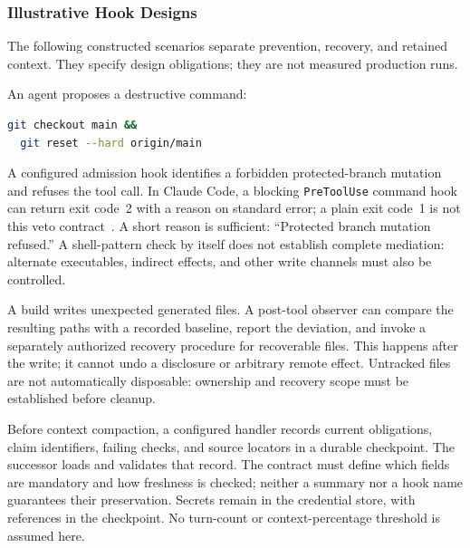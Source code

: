 \subsubsection{Illustrative Hook Designs}
\label{sec:lifecycle-hook-cases}
The following constructed scenarios separate prevention, recovery, and retained
context. They specify design obligations; they are not measured production runs.

\begin{description}[leftmargin=1.5em,style=sameline,font=\normalfont]
\item[\textbf{Case A: Pre-tool refusal.}]
An agent proposes a destructive command:
\begin{lstlisting}[language=bash,basicstyle=\ttfamily\small,breaklines=true]
git checkout main &&
  git reset --hard origin/main
\end{lstlisting}
A configured admission hook identifies a forbidden protected-branch mutation
and refuses the tool call. In Claude Code, a blocking \texttt{PreToolUse}
command hook can return exit code~2 with a reason on standard error; a plain
exit code~1 is not this veto contract~. A short
reason is sufficient: ``Protected branch mutation refused.'' A shell-pattern
check by itself does not establish complete mediation: alternate executables,
indirect effects, and other write channels must also be controlled.

\item[\textbf{Case B: Post-tool recovery.}]
A build writes unexpected generated files. A post-tool observer can compare
the resulting paths with a recorded baseline, report the deviation, and invoke
a separately authorized recovery procedure for recoverable files. This happens
after the write; it cannot undo a disclosure or arbitrary remote effect.
Untracked files are not automatically disposable: ownership and recovery
scope must be established before cleanup.

\item[\textbf{Case C: Compaction preparation.}]
Before context compaction, a configured handler records current obligations,
claim identifiers, failing checks, and source locators in a durable checkpoint.
The successor loads and validates that record. The contract must define which
fields are mandatory and how freshness is checked; neither a summary nor a
hook name guarantees their preservation. Secrets remain in the credential
store, with references in the checkpoint. No turn-count or context-percentage
threshold is assumed here.
\end{description}

